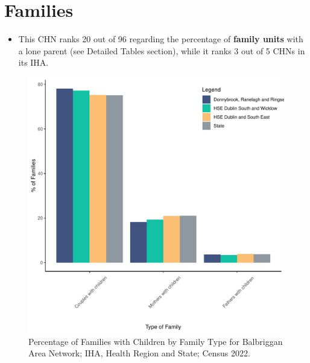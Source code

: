 \documentclass{article}
\begin{document}
\section{Families}\label{sect:Fam}
\begin{itemize}
\item This CHN ranks  20 out of 96 regarding the percentage of \textbf{family units} with a lone parent (see Detailed Tables section), while it ranks   3 out of 5 CHNs in its IHA.
\end{itemize}
\begin{figure}[H]
	\centering
	\includegraphics[width = 150mm]{../figures/FamED.pdf}
	\caption{Percentage of Families with Children by Family Type for Balbriggan Area Network; IHA, Health Region and State; Census 2022.}
	\label{fig:vbnv}
	\end{figure}
	
\end{document}
